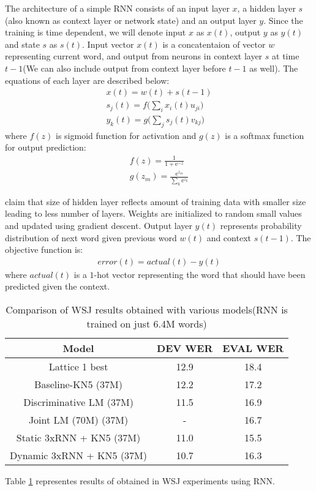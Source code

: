 The architecture of a simple RNN consists of an input layer $x$, a hidden layer $s$(also known as context layer or network state) and an output layer $y$. Since the training is time dependent, we will denote input $x$ as $x(t)$, output $y$ as $y(t)$ and state $s$ as $s(t)$. Input vector $x(t)$ is a concatentaion of vector $w$ representing current word, and output from neurons in context layer $s$ at time $t-1$(We can also include output from context layer before $t-1$ as well). The equations of each layer are described below:
\begin{align}
x(t) = w(t) + s(t-1) \\
s_j(t) = f\bigg(\sum_{i}x_i(t)u_{ji}\bigg) \\
y_k(t) = g\bigg(\sum_{j}s_j(t)v_{kj}\bigg)
\end{align}
where $f(z)$ is sigmoid function for activation and $g(z)$ is a softmax function for output prediction:
\begin{align}
f(z) = \frac{1}{1+\mathrm{e}^{-z}} \\
g(z_m) = \frac{\mathrm{e}^{z_m}}{\sum_{k}\mathrm{e}^{z_k}}
\end{align}

\cite{Mikolov:10} claim that size of hidden layer reflects amount of training data with smaller size leading to less number of layers. Weights are initialized to random small values and updated using gradient descent. Output layer $y(t)$ represents probability distribution of next word given previous word $w(t)$ and context $s(t-1)$. The objective function is:
\begin{align}
error(t) =  actual(t) - y(t)
\end{align}
where $actual(t)$ is a $1$-hot vector representing the word that should have been predicted given the context.
\begin {table}[h!]
\centering
\begin{tabular}{ |c|c|c| }
\hline
Model & DEV WER & EVAL WER \\ \hline
Lattice 1 best & 12.9 & 18.4 \\ 
Baseline-KN5 (37M) & 12.2 & 17.2 \\
Discriminative LM (37M) & 11.5 & 16.9 \\
Joint LM (70M) (37M) & - & 16.7 \\ \hline
Static 3xRNN + KN5 (37M) & 11.0 & 15.5 \\
Dynamic 3xRNN + KN5 (37M) & 10.7 & 16.3 \\
\hline
\end{tabular}
\caption {Comparison of WSJ results obtained with various models(RNN is trained on just 6.4M words)}
\label{table:rnn}
\end{table}
Table \ref{table:rnn} representes results of \cite{Mikolov:10} obtained in WSJ experiments using RNN.\\

